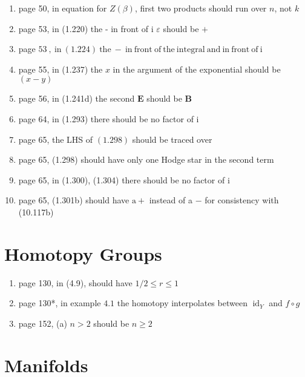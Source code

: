 \documentclass{article}
\newcommand\Dag{\textsuperscript{\dagger}}
\begin{document}
\begin{enumerate}
\item page 50, in equation for $Z(\beta)$, first two products should run over $n$, not $k$

\item page 53, in (1.220) the - in front of i $\varepsilon$ should be $+$

\item page $53 \mathrm{~ , ~ i n ~ ( 1 . 2 2 4 ) ~ t h e ~ - ~ i n ~ f r o n t ~ o f ~ t h e ~ i n t e g r a l ~ a n d ~ i n ~ f r o n t ~ o f ~ i}$

\item page 55, in (1.237) the $x$ in the argument of the exponential should be $(x-y)$

\item page 56, in (1.241d) the second $\mathbf{E}$ should be $\mathbf{B}$

\item page 64, in (1.293) there should be no factor of i

\item page 65, the LHS of $(1.298)$ should be traced over

\item page 65, (1.298) should have only one Hodge star in the second term

\item page 65, in (1.300), (1.304) there should be no factor of $\mathrm{i}$

\item page 65, (1.301b) should have $\mathrm{a}+$ instead of a $-$ for consistency with (10.117b)

\end{enumerate}

\section*{Homotopy Groups}

\begin{enumerate}
\item page 130, in (4.9), should have $1 / 2 \leq r \leq 1$
\item page 130*, in example $4.1$ the homotopy interpolates between $\operatorname{id}_{Y}$ and $f \circ g$
\item page 152\Dag, (a) $n > 2$ should be $n \geq 2$
\end{enumerate}

\section*{Manifolds}
\end{document}
